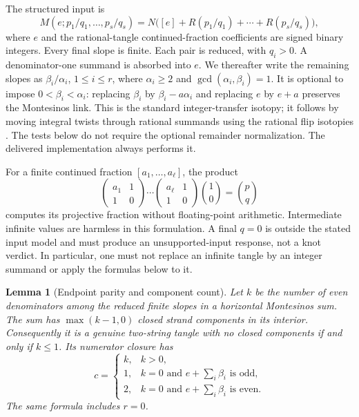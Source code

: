 \documentclass[11pt,a4paper]{article}
\newtheorem{lemma}[theorem]{Lemma}
\theoremstyle{definition}
\theoremstyle{remark}
\numberwithin{equation}{section}
\begin{document}
The structured input is
\[
 M(e;p_1/q_1,\ldots,p_s/q_s)
 =N\bigl([e]+R(p_1/q_1)+\cdots+R(p_s/q_s)\bigr),
\]
where $e$ and the rational-tangle continued-fraction coefficients are signed
binary integers.  Every final slope is finite.  Each pair is reduced, with
$q_i>0$.  A denominator-one summand is absorbed into $e$.  We thereafter write
the remaining slopes as $\beta_i/\alpha_i$, $1\le i\le r$, where
$\alpha_i\ge2$ and $\gcd(\alpha_i,\beta_i)=1$.
It is optional to impose $0<\beta_i<\alpha_i$: replacing
$\beta_i$ by $\beta_i-a\alpha_i$ and replacing $e$ by $e+a$ preserves the
Montesinos link.  This is the standard integer-transfer isotopy; it follows
by moving integral twists through rational summands using the rational flip
isotopies \cite[Section~2]{kauffman-lambropoulou-tangles}.
The tests below do not require the optional remainder normalization. The delivered implementation always performs it.

For a finite continued fraction $[a_1,\ldots,a_\ell]$, the product
\[
 \begin{pmatrix}a_1&1\\1&0\end{pmatrix}\cdots
 \begin{pmatrix}a_\ell&1\\1&0\end{pmatrix}
 \binom10=\binom pq
\]
computes its projective fraction without floating-point arithmetic.  Intermediate
infinite values are harmless in this formulation.  A final $q=0$ is outside
the stated input model and must produce an unsupported-input response, not a
knot verdict.  In particular, one must not replace an infinite tangle by an
integer summand or apply the formulas below to it.

\begin{lemma}[Endpoint parity and component count]\label{lem:mon:parity}
Let $k$ be the number of even denominators among the reduced finite slopes in
a horizontal Montesinos sum.  The sum has $\max(k-1,0)$ closed strand
components in its interior.  Consequently it is a genuine two-string tangle
with no closed components if and only if $k\le1$.
Its numerator closure has
\[
 c=\begin{cases}
 k,&k>0,\\
 1,&k=0\text{ and }e+\sum_i\beta_i\text{ is odd},\\
 2,&k=0\text{ and }e+\sum_i\beta_i\text{ is even}.
 \end{cases}
\]
The same formula includes $r=0$.
\end{lemma}
\end{document}
